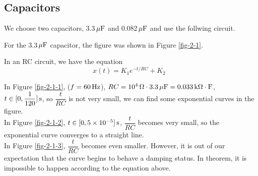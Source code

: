 \documentclass{article}
\newcommand{\unit}[1]{{\rm\,#1}}
\begin{document}
\newpage

\subsection{Capacitors}

We choose two capacitors, 3.3$\unit{\mu F}$ and 0.082$\unit{\mu F}$ and use the follwing circuit.

\begin{center}
\end{center}

For the 3.3$\unit{\mu F}$ capacitor, the figure was shown in Figure \ref{fig-2-1}.


In an RC circuit, we have the equation
$$x(t)=K_1e^{-t/RC}+K_2$$

In Figure \ref{fig-2-1-1}, ($f=60\unit{Hz}$), $RC=10^4\unit{\Omega}\cdot3.3\unit{\mu F}=0.033\unit{k\Omega\cdot F}$, $t\in[0,\dfrac{1}{120}]\unit{s}$, so $\dfrac{t}{RC}$ is not very small, we can find some exponential curves in the figure.\\[-0.5em]

In Figure \ref{fig-2-1-2}, $t\in[0,5\times10^{-5}]\unit{s}$, $\dfrac{t}{RC}$ becomes very small, so the exponential curve converges to a straight line.\\[-0.5em]

In Figure \ref{fig-2-1-3}, $\dfrac{t}{RC}$ becomes even smaller. However, it is out of our expectation that the curve begins to behave a damping status. In theorem, it is impossible to happen according to the equation above.\\[-0.5em]
\end{document}
